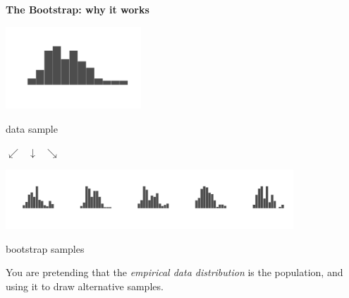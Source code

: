 \documentclass[11pt,xcolor=svgnames]{beamer}
\newcommand{\theme}{\color{Maroon}}
\newcommand{\bk}{\color{black}}
\newcommand{\gr}{\color{black!60}}
\newcommand{\sk}{\vspace{.5cm}}
\begin{document}
\begin{frame}

{\bf \theme The Bootstrap: \bk why it works}

\begin{center}
\includegraphics[width=2in]{../graphs/bs_bighist}

{\gr data sample}

$\swarrow~~~\downarrow~~~\searrow$

\includegraphics[width=4.25in]{../graphs/bs_boothist}

\gr bootstrap samples
\end{center}

You are pretending that the {\it empirical data distribution} is
the population, and using it to draw alternative samples.
\end{frame}











\end{document}
